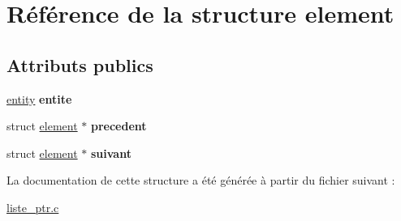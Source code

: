 \hypertarget{structelement}{\section{Référence de la structure element}
\label{structelement}
}
\subsection*{Attributs publics}
\begin{DoxyCompactItemize}
\item 
\hypertarget{structelement_a04472b62bb8a7aa167df4bb3911a4de8}{\hyperlink{structentity}{entity} {\bfseries entite}}\label{structelement_a04472b62bb8a7aa167df4bb3911a4de8}

\item 
\hypertarget{structelement_a550cdb9049ec7d2d976c1649cf643abe}{struct \hyperlink{structelement}{element} $\ast$ {\bfseries precedent}}\label{structelement_a550cdb9049ec7d2d976c1649cf643abe}

\item 
\hypertarget{structelement_a4f1534ded1f9373e0843568bf94ea754}{struct \hyperlink{structelement}{element} $\ast$ {\bfseries suivant}}\label{structelement_a4f1534ded1f9373e0843568bf94ea754}

\end{DoxyCompactItemize}


La documentation de cette structure a été générée à partir du fichier suivant \-:\begin{DoxyCompactItemize}
\item 
\hyperlink{liste__ptr_8c}{liste\-\_\-ptr.\-c}\end{DoxyCompactItemize}
